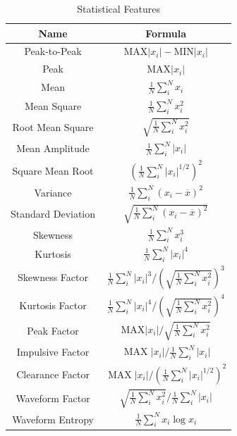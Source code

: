 \documentclass{bioinfo}
\begin{document}
\begin{table}[htbp]
	\centering
	\caption{Statistical Features}  
	\begin{tabular}{|c|c|}  
		\hline  
		Name & Formula\\  
		\hline  
		Peak-to-Peak  & $\mathrm{M} \mathrm{AX}|x_i|-\mathrm{MIN}|x_i|$ \\
		\hline  
		Peak  & $\mathrm{M} \mathrm{A} \mathrm{X}|x_i|$ \\ 
		\hline  
		Mean  & $\frac{1}{N} \sum\limits_{i}^{N} x_i$ \\ 
		\hline  
		Mean Square  & $\frac{1}{N} \sum\limits_{i}^{N} x_i^{2}$ \\ 
		\hline  
		Root Mean Square  & $\sqrt{\frac{1}{N} \sum\limits_{i}^{N} x_i^{2}}$ \\ 
		\hline  
		Mean Amplitude  & $\frac{1}{N} \sum\limits_{i}^{N}|x_i|$ \\
		\hline  
		Square Mean Root  & $\left(\frac{1}{N} \sum\limits_{i}^{N}|x_i|^{1 / 2}\right)^{2}$ \\ 
		\hline  
		Variance  & $\frac{1}{N} \sum\limits_{i}^{N}(x_i-\overline{x})^{2}$ \\ 
		\hline  
		Standard Deviation  & $\sqrt{\frac{1}{N} \sum\limits_{i}^{N}(x_i-\overline{x})^{2}}$ \\
		\hline   
		Skewness  & $\frac{1}{N} \sum\limits_{i}^{N} x_i^{3}$ \\ 
		\hline  
		Kurtosis  & $\frac{1}{N} \sum\limits_{i}^{N}|x_i|^{4}$ \\
		\hline  
		Skewness Factor  & $\frac{1}{N} \sum\limits_{i}^{N}|x_i|^{3} /\left(\sqrt{\frac{1}{N} \sum\limits_{i}^{N} x_i^{2}}\right)^{3}$ \\ 
		\hline  
		Kurtosis Factor  & $\frac{1}{N} \sum\limits_{i}^{N}|x_i|^{4} /\left(\sqrt{\frac{1}{N} \sum\limits_{i}^{N} x_i^{2}}\right)^{4}$ \\ 
		\hline  
		Peak Factor  & $\mathrm{MAX}|x_i| / \sqrt{\frac{1}{N} \sum\limits_{i}^{N} x_i^{2}}$ \\ 
		\hline  
		Impulsive Factor  & $\operatorname{MAX}|x_i| / \frac{1}{N} \sum\limits_{i}^{N}|x_i|$ \\ 
		\hline  
		Clearance Factor  & $\operatorname{MAX}|x_i| /\left(\frac{1}{N} \sum\limits_{i}^{N}|x_i|^{1 / 2}\right)^{2}$ \\ 
		\hline  
		Waveform Factor  & $\sqrt{\frac{1}{N} \sum\limits_{i}^{N} x_i^{2}} / \frac{1}{N} \sum\limits_{i}^{N}|x_i|$ \\ 
		\hline  
		Waveform Entropy \cite{ZHANG201914} & $\frac{1}{N}\sum\limits_{i}^{N}x_i\log x_i$ \\ 
		\hline  
	\end{tabular} 
	\label{tab:sf} 
\end{table} 
\end{document}
